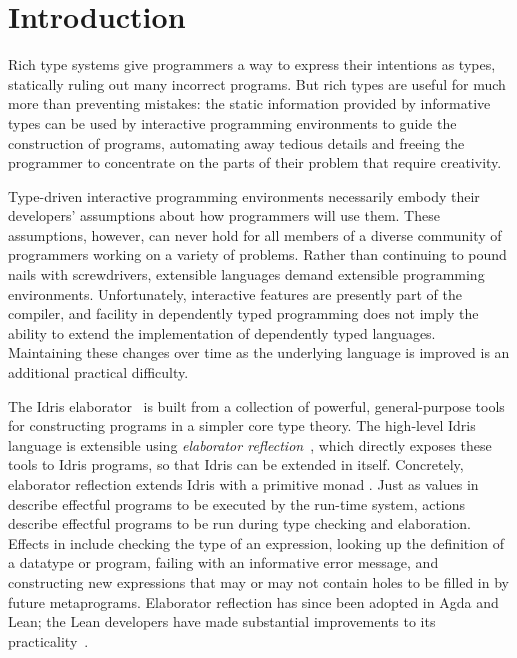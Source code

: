 \section{Introduction} \label{sec:introduction}

Rich type systems give programmers a way to express their intentions
as types, statically ruling out many incorrect programs. But rich
types are useful for much more than preventing mistakes: the static
information provided by informative types can be used by interactive
programming environments to guide the construction of programs,
automating away tedious details and freeing the programmer to
concentrate on the parts of their problem that require creativity.

Type-driven interactive programming environments necessarily embody
their developers' assumptions about how programmers will use
them. These assumptions, however, can never hold for all members of a
diverse community of programmers working on a variety of
problems. Rather than continuing to pound nails with screwdrivers,
extensible languages demand extensible programming environments.
Unfortunately, interactive features are presently part of the
compiler, and facility in dependently typed programming does not imply
the ability to extend the implementation of dependently typed
languages. Maintaining these changes over time as the underlying
language is improved is an additional practical difficulty.

The Idris elaborator~\citep{idris} is built from a collection of
powerful, general-purpose tools for constructing programs in a simpler
core type theory. The high-level Idris language is extensible using
\emph{elaborator reflection}~\citep{davidphd, elabref}, which directly
exposes these tools to Idris programs, so that Idris can be extended
in itself. Concretely, elaborator reflection extends Idris with a
primitive monad \Elab{}. Just as values in \IO{} describe effectful
programs to be executed by the run-time system, \Elab{} actions
describe effectful programs to be run during type checking and
elaboration. Effects in \Elab{} include checking the type of an
expression, looking up the definition of a datatype or program,
failing with an informative error message, and constructing new
expressions that may or may not contain holes to be filled in by
future metaprograms. Elaborator reflection has since been adopted in
Agda and Lean; the Lean developers have made substantial improvements
to its practicality~\citep{leanmeta, agdachangelogTC}.


